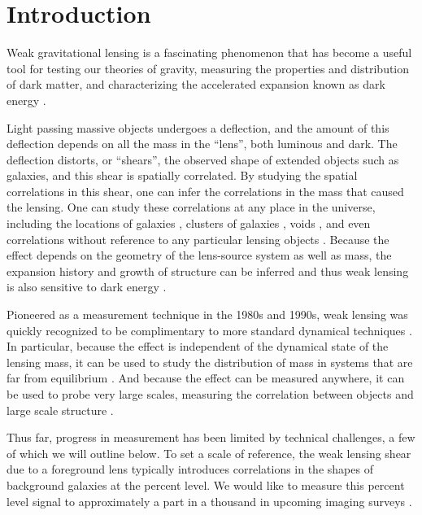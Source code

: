 \documentclass[iop]{emulateapj}
\begin{document}

\section{Introduction} \label{sec:intro}

Weak gravitational lensing is a fascinating phenomenon that has become a useful
tool for testing our theories of gravity, measuring the properties and
distribution of dark matter, and characterizing the accelerated expansion known
as dark energy \citep[for a review, see][]{HoekstraJain2008}.

Light passing massive objects undergoes a deflection, and the amount of this
deflection depends on all the mass in the ``lens'', both luminous and dark.
The deflection distorts, or ``shears'', the observed shape of extended objects
such as galaxies, and this shear is spatially correlated.  By studying the
spatial correlations in this shear, one can infer the correlations in the mass
that caused the lensing. One can study these correlations at any place in the
universe, including the locations of galaxies \citep{Mandelbaum06}, clusters of
galaxies \citep{JohnstonLensing07}, voids \citep{MelchiorVoids2014}, and even
correlations without reference to any particular lensing objects
\citep{CFHTCosmicShear2013}.  Because the effect depends on the geometry of the
lens-source system as well as mass, the expansion history and growth of
structure can be inferred  and thus weak lensing is also sensitive to dark
energy \citep{HeymansTomography2013}.


Pioneered as a measurement technique in the 1980s and 1990s, weak lensing was
quickly recognized to be complimentary to more standard dynamical techniques
\citep{Tyson84}.  In particular, because the effect is independent of the
dynamical state of the lensing mass, it can be used to study the distribution
of mass in systems that are far from equilibrium \citep{CloweDMProof06}.   And
because the effect can be measured anywhere, it can be used to probe very large
scales, measuring the correlation between objects and large scale structure
 \citep{SheldonLensing09}.

Thus far, progress in measurement has been limited by technical challenges, a
few of which we will outline below.  To set a scale of reference, the weak
lensing shear due to a foreground lens typically introduces correlations in the
shapes of background galaxies at the percent level.    We would like to measure
this percent level signal to approximately a part in a thousand in upcoming
imaging surveys \citep{HutererSystematics06}.
\end{document}
